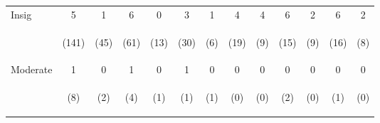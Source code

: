 \begin{tabular}{lcccccccccccc}
\hline \noalign{\smallskip}Insig & 5 & 1 & 6 & 0 & 3 & 1 & 4 & 4 & 6 & 2 & 6 & 2\\
 & \begin{footnotesize}(141)\end{footnotesize} & \begin{footnotesize}(45)\end{footnotesize} & \begin{footnotesize}(61)\end{footnotesize} & \begin{footnotesize}(13)\end{footnotesize} & \begin{footnotesize}(30)\end{footnotesize} & \begin{footnotesize}(6)\end{footnotesize} & \begin{footnotesize}(19)\end{footnotesize} & \begin{footnotesize}(9)\end{footnotesize} & \begin{footnotesize}(15)\end{footnotesize} & \begin{footnotesize}(9)\end{footnotesize} & \begin{footnotesize}(16)\end{footnotesize} & \begin{footnotesize}(8)\end{footnotesize}\\
\noalign{\smallskip}Moderate & 1 & 0 & 1 & 0 & 1 & 0 & 0 & 0 & 0 & 0 & 0 & 0\\
 & \begin{footnotesize}(8)\end{footnotesize} & \begin{footnotesize}(2)\end{footnotesize} & \begin{footnotesize}(4)\end{footnotesize} & \begin{footnotesize}(1)\end{footnotesize} & \begin{footnotesize}(1)\end{footnotesize} & \begin{footnotesize}(1)\end{footnotesize} & \begin{footnotesize}(0)\end{footnotesize} & \begin{footnotesize}(0)\end{footnotesize} & \begin{footnotesize}(2)\end{footnotesize} & \begin{footnotesize}(0)\end{footnotesize} & \begin{footnotesize}(1)\end{footnotesize} & \begin{footnotesize}(0)\end{footnotesize}\\

\end{tabular}
